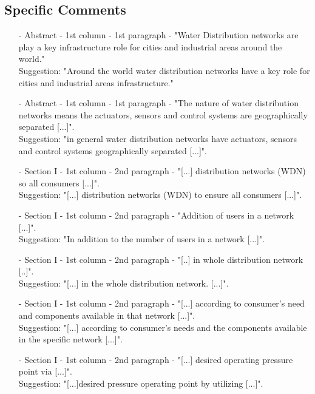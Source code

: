 \subsection{Specific Comments}
\begin{itemize}
\item[-]Abstract - 1st column - 1st paragraph - "Water Distribution networks are play a key infrastructure role for cities and industrial areas around the world."\\
Suggestion: "Around the world water distribution networks have a key role for cities and industrial areas infrastructure."\\
\item[-]Abstract - 1st column - 1st paragraph - "The nature of water distribution networks means the actuators, sensors and control systems are geographically separated [...]".\\
Suggestion: "in general water distribution networks have actuators, sensors and control systems geographically separated [...]".\\
\item[-]Section I - 1st column - 2nd paragraph - "[...] distribution networks (WDN) so all consumers [...]".\\
Suggestion: "[...] distribution networks (WDN) to ensure all consumers [...]".\\
\item[-] Section I - 1st column - 2nd paragraph - "Addition of users in a network [...]".\\
Suggestion: "In addition to the number of users in a network [...]".\\
\item[-]Section I - 1st column - 2nd paragraph - "[..] in whole distribution network [..]".\\
Suggestion: "[...] in the whole distribution network. [...]".\\
\item[-]Section I - 1st column - 2nd paragraph - "[...] according to consumer's need and components available in that network [...]".\\
Suggestion: "[...] according to  consumer's needs and the components available in the specific network [...]".\\
\item[-]Section I - 1st column - 2nd paragraph - "[...] desired operating pressure point via [...]".\\
Suggestion: "[...]desired pressure operating point by utilizing [...]".\\

\end{itemize}
